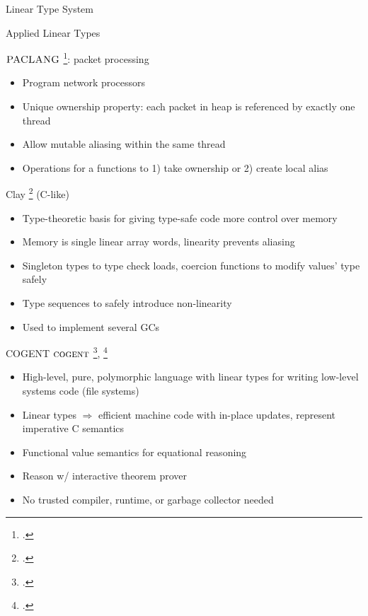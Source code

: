 \documentclass[aspectratio=169]{beamer}
\begin{document}
\begin{frame}{Linear Type System}
\end{frame}

\begin{frame}{Applied Linear Types}
\footnotesize{
$\textsc{PACLANG}$ \footcite{ennals_linear_2004}: packet processing
  \begin{itemize}
    \item Program network processors %
    \item Unique ownership property: each packet in heap is referenced by exactly one thread
    \item Allow mutable aliasing within the same thread
    \item Operations for a functions to 1) take ownership or 2) create local alias
  \end{itemize}
Clay \footcite{hawblitzel_low-level_2004} (C-like) 
  \begin{itemize}
    \item Type-theoretic basis for giving type-safe code more control over memory
    \item Memory is single linear array words, linearity prevents aliasing
    \item Singleton types to type check loads, coercion functions to modify values' type safely
    \item Type sequences to safely introduce non-linearity %
    \item Used to implement several GCs
  \end{itemize}
}
\end{frame}

\begin{frame}{COGENT}
$\textsc{cogent}$ \footcite{amani_cogent:_2016}, \footcite{oconnor_cogent:_2016}
    \begin{itemize}
        \item High-level, pure, polymorphic language with linear types for writing low-level systems code (file systems)
        \item Linear types $\Rightarrow$ efficient machine code with in-place updates, represent imperative C semantics
        \item Functional value semantics for equational reasoning
        \item Reason w/ interactive theorem prover
        \item No trusted compiler, runtime, or garbage collector needed
    \end{itemize}
\end{frame}
\end{document}
